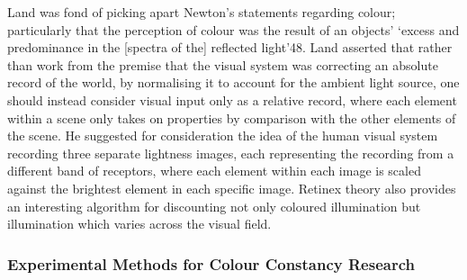 Land was fond of picking apart Newton's statements regarding colour; particularly that the perception of colour was the result of an objects' `excess and predominance in the [spectra of the] reflected light'48. Land asserted that rather than work from the premise that the visual system was correcting an absolute record of the world, by normalising it to account for the ambient light source, one should instead consider visual input only as a relative record, where each element within a scene only takes on properties by comparison with the other elements of the scene. 
He suggested for consideration the idea of the human visual system recording three separate lightness images, each representing the recording from a different band of receptors, where each element within each image is scaled against the brightest element in each specific image. Retinex theory also provides an interesting algorithm for discounting not only coloured illumination but illumination which varies across the visual field.



\subsubsection{Experimental Methods for Colour Constancy Research}

